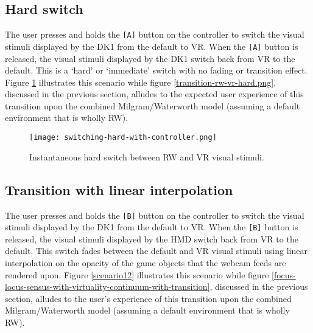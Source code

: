
\subsection{Hard switch}
\label{sub-hardswitch}
The user presses and holds the \texttt{[A]} button on the controller to switch the visual stimuli displayed by the DK1 from the default to VR. When the \texttt{[A]} button is released, the visual stimuli displayed by the DK1 switch back from VR to the default. This is a `hard' or `immediate' switch with no fading or transition effect. Figure \ref{scenario1} illustrates this scenario while figure \ref{transition-rw-vr-hard.png}, discussed in the previous section, alludes to the expected user experience of this transition upon the combined Milgram/Waterworth model (assuming a default environment that is wholly RW).

\begin{figure}[h]
	\begin{center}
		\texttt{[image: switching-hard-with-controller.png]}
		\caption{Instantaneous hard switch between RW and VR visual stimuli.}
		\label{scenario1}
	\end{center}
\end{figure}


\subsection{Transition with linear interpolation}
\label{transition-with-linear-interpolation}
The user presses and holds the \texttt{[B]} button on the controller to switch the visual stimuli displayed by the DK1 from the default to VR. When the \texttt{[B]} button is released, the visual stimuli displayed by the HMD switch back from VR to the default. This switch fades between the default and VR  visual stimuli using linear interpolation on the opacity of the game objects that the webcam feeds are rendered upon. Figure \ref{scenario12} illustrates this scenario while figure \ref{focus-locus-sensus-with-virtuality-continuum-with-transition}, discussed in the previous section, alludes to the user's experience of this transition upon the combined Milgram/Waterworth model (assuming a default environment that is wholly RW).

